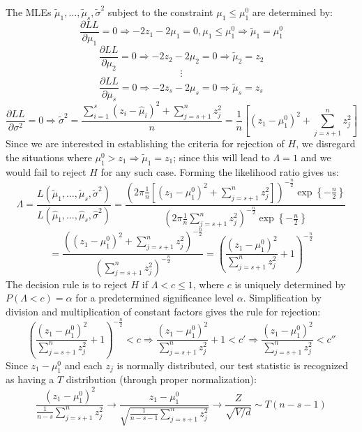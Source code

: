 \begin{homeworkProblem}
\[\]
The MLEs $\tilde \mu _1 , \ldots ,\tilde \mu _s ,\tilde \sigma ^2$ 
subject to the constraint ${\mu _1  \leqslant \mu _1^0 }$ are 
determined by:
\[
\frac{{\partial LL}}
{{\partial \mu _1 }} = 0 \Rightarrow  - 2z_1  - 2\mu _1  = 0,\mu _1  
\leqslant \mu _1^0  \Rightarrow \tilde \mu _1  = \mu _1^0 
\]
\[
\frac{{\partial LL}}
{{\partial \mu _2 }} = 0 \Rightarrow  - 2z_2  - 2\mu _2  = 0 
\Rightarrow \tilde \mu _2  = z_2 
\]
\[
 \vdots 
\]
\[
\frac{{\partial LL}}
{{\partial \mu _s }} = 0 \Rightarrow  - 2z_s  - 2\mu _s  = 0 
\Rightarrow \tilde \mu _s  = z_s 
\]
\[
\frac{{\partial LL}}
{{\partial \sigma ^2 }} = 0 \Rightarrow \tilde \sigma ^2  = 
\frac{{\sum\limits_{i = 1}^s {\left( {z_i  - \hat \mu _i } \right)^2 }  
+ \sum\limits_{j = s + 1}^n {z_j^2 } }}
{n} = \frac{1}
{n}\left[ {\left( {z_1  - \mu _1^0 } \right)^2  + \sum\limits_{j = s + 
1}^n {z_j^2 } } \right]
\]
Since we are interested in establishing the criteria for rejection of 
$H$, we disregard the situations where $\mu _1^0  > z_1  \Rightarrow 
\tilde \mu _1  = z_1 $; since this will lead to $\Lambda=1$ and we 
would fail to reject $H$ for any such case. Forming the likelihood 
ratio gives us:
\[
\Lambda  = \frac{{L\left( {\tilde \mu _1 , \ldots ,\tilde \mu _s 
,\tilde \sigma ^2 } \right)}}
{{L\left( {\hat \mu _1 , \ldots ,\hat \mu _s ,\hat \sigma ^2 } 
\right)}} = \frac{{\left( {2\pi \frac{1}
{n}\left[ {\left( {z_1  - \mu _1^0 } \right)^2  + \sum\limits_{j = s + 
1}^n {z_j^2 } } \right]} \right)^{ - \frac{n}
{2}} \exp \left\{ { - \frac{n}
{2}} \right\}}}
{{\left( {2\pi \frac{1}
{n}\sum\limits_{j = s + 1}^n {z_j^2 } } \right)^{ - \frac{n}
{2}} \exp \left\{ { - \frac{n}
{2}} \right\}}}
\]
\[
 = \frac{{\left( {\left( {z_1  - \mu _1^0 } \right)^2  + 
\sum\limits_{j = s + 1}^n {z_j^2 } } \right)^{ - \frac{n}
{2}} }}
{{\left( {\sum\limits_{j = s + 1}^n {z_j^2 } } \right)^{ - \frac{n}
{2}} }} = \left( {\frac{{\left( {z_1  - \mu _1^0 } \right)^2 }}
{{\sum\limits_{j = s + 1}^n {z_j^2 } }} + 1} \right)^{ - \frac{n}
{2}} 
\]
The decision rule is to reject $H$ if $\Lambda  < c \le 1$, where $c$ 
is uniquely determined by $P\left( {\Lambda  < c  } \right) = \alpha$ 
for a predetermined significance level $\alpha$. Simplification by 
division and multiplication of constant factors gives the rule for 
rejection:
\[
\left( {\frac{{\left( {z_1  - \mu _1^0 } \right)^2 }}
{{\sum\limits_{j = s + 1}^n {z_j^2 } }} + 1} \right)^{ - \frac{n}
{2}}  < c \Rightarrow \frac{{\left( {z_1  - \mu _1^0 } \right)^2 }}
{{\sum\limits_{j = s + 1}^n {z_j^2 } }} + 1 < c' \Rightarrow 
\frac{{\left( {z_1  - \mu _1^0 } \right)^2 }}
{{\sum\limits_{j = s + 1}^n {z_j^2 } }} < c''
\]
Since ${z_1  - \mu _1^0 }$  and each $z_j$ is normally distributed, 
our test statistic is recognized as having a $T$ distribution (through 
proper normalization):
\[
\frac{{\left( {z_1  - \mu _1^0 } \right)^2 }}
{{\frac{1}
{{n - s}}\sum\limits_{j = s + 1}^n {z_j^2 } }} \to \frac{{z_1  - \mu 
_1^0 }}
{{\sqrt {\frac{1}
{{n - s - 1}}\sum\limits_{j = s + 1}^n {z_j^2 } } }} \to \frac{Z}
{{\sqrt {V/d} }}\sim T\left( {n - s - 1} \right)
\]


\end{homeworkProblem}
